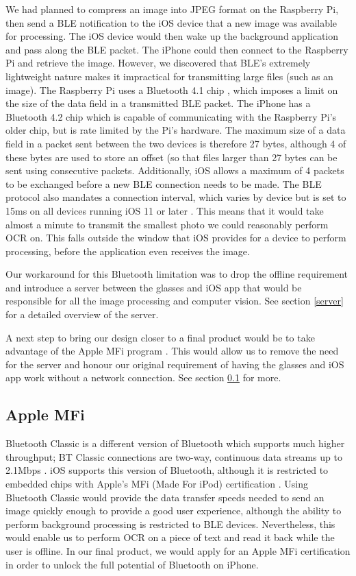 \documentclass[a4paper,11pt]{article}
\begin{document}
We had planned to compress an image into JPEG format on the Raspberry Pi, then send a BLE notification to the iOS device that a new image was available for processing. The iOS device would then wake up the background application and pass along the BLE packet. The iPhone could then connect to the Raspberry Pi and retrieve the image. However, we discovered that BLE's extremely lightweight nature makes it impractical for transmitting large files (such as an image). The Raspberry Pi uses a Bluetooth 4.1 chip \cite{raspi-hardware}, which imposes a limit on the size of the data field in a transmitted BLE packet. The iPhone has a Bluetooth 4.2 chip \cite{iphone-hardware} which is capable of communicating with the Raspberry Pi's older chip, but is rate limited by the Pi's hardware. The maximum size of a data field in a packet sent between the two devices is therefore 27 bytes, although 4 of these bytes are used to store an offset (so that files larger than 27 bytes can be sent using consecutive packets. Additionally, iOS allows a maximum of 4 packets to be exchanged before a new BLE connection needs to be made. The BLE protocol also mandates a connection interval, which varies by device but is set to 15ms on all devices running iOS 11 or later \cite{apple-bluetooth}. This means that it would take almost a minute to transmit the smallest photo we could reasonably perform OCR on. This falls outside the window that iOS provides for a device to perform processing, before the application even receives the image.

Our workaround for this Bluetooth limitation was to drop the offline requirement and introduce a server between the glasses and iOS app that would be responsible for all the image processing and computer vision. See section \ref{server} for a detailed overview of the server.

A next step to bring our design closer to a final product would be to take advantage of the Apple MFi program \cite{apple-mfi}. This would allow us to remove the need for the server and honour our original requirement of having the glasses and iOS app work without a network connection. See section \ref{apple-mfi} for more.

\subsection{Apple MFi}
\label{apple-mfi}
Bluetooth Classic is a different version of Bluetooth which supports much higher throughput; BT Classic connections are two-way, continuous data streams up to 2.1Mbps \cite{bluetooth-classic}. iOS supports this version of Bluetooth, although it is restricted to embedded chips with Apple's MFi (Made For iPod) certification \cite{apple-mfi}. Using Bluetooth Classic would provide the data transfer speeds needed to send an image quickly enough to provide a good user experience, although the ability to perform background processing is restricted to BLE devices. Nevertheless, this would enable us to perform OCR on a piece of text and read it back while the user is offline. In our final product, we would apply for an Apple MFi certification in order to unlock the full potential of Bluetooth on iPhone.
\end{document}
